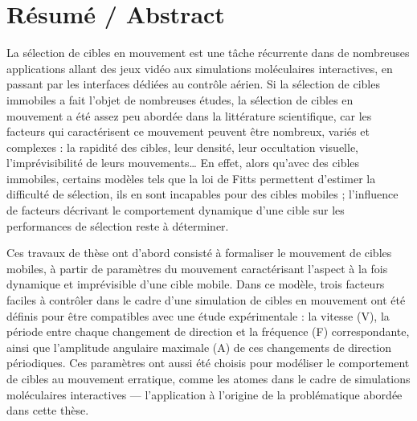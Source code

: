 
\chapter*{Résumé / Abstract}%


%

\pagestyle{plain}

La sélection de cibles en mouvement est une tâche récurrente dans de nombreuses applications allant des jeux vidéo aux simulations moléculaires interactives, en passant par les interfaces dédiées au contrôle aérien. Si la sélection de cibles immobiles a fait l'objet de nombreuses études, la sélection de cibles en mouvement a été assez peu abordée dans la littérature scientifique, car les facteurs qui caractérisent ce mouvement peuvent être nombreux, variés et complexes : la rapidité des cibles, leur densité, leur occultation visuelle, l'imprévisibilité de leurs mouvements\ldots{} En effet, alors qu’avec des cibles immobiles, certains modèles tels que la loi de Fitts permettent d’estimer la difficulté de sélection, ils en sont incapables pour des cibles mobiles ; l'influence de facteurs décrivant le comportement dynamique d'une cible sur les performances de sélection reste à déterminer.

Ces travaux de thèse ont d'abord consisté à formaliser le mouvement de cibles mobiles, à partir de paramètres du mouvement caractérisant l'aspect à la fois dynamique et imprévisible d'une cible mobile. Dans ce modèle, trois facteurs faciles à contrôler dans le cadre d'une simulation de cibles en mouvement ont été définis pour être compatibles avec une étude expérimentale : la vitesse (V), la période entre chaque changement de direction et la fréquence (F) correspondante, ainsi que l'amplitude angulaire maximale (A) de ces changements de direction périodiques. Ces paramètres ont aussi été choisis pour modéliser le comportement de cibles au mouvement erratique, comme les atomes dans le cadre de simulations moléculaires interactives --- l’application à l’origine de la problématique abordée dans cette thèse.

